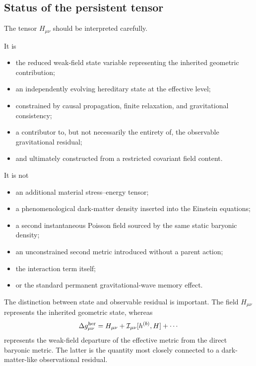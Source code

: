 \subsection{Status of the persistent tensor}
\label{subsec:persistent-tensor-status}

The tensor $H_{\mu\nu}$ should be interpreted carefully.

It is
\begin{itemize}
    \item the reduced weak-field state variable representing the inherited
    geometric contribution;

    \item an independently evolving hereditary state at the effective level;

    \item constrained by causal propagation, finite relaxation, and
    gravitational consistency;

    \item a contributor to, but not necessarily the entirety of, the observable
    gravitational residual;

    \item and ultimately constructed from a restricted covariant field content.
\end{itemize}

It is not
\begin{itemize}
    \item an additional material stress--energy tensor;

    \item a phenomenological dark-matter density inserted into the Einstein
    equations;

    \item a second instantaneous Poisson field sourced by the same static
    baryonic density;

    \item an unconstrained second metric introduced without a parent action;

    \item the interaction term itself;

    \item or the standard permanent gravitational-wave memory effect.
\end{itemize}

The distinction between state and observable residual is important. The field
$H_{\mu\nu}$ represents the inherited geometric state, whereas
\begin{equation}
    \Delta g_{\mu\nu}^{\rm her}
    =
    H_{\mu\nu}
    +
    \mathcal{I}_{\mu\nu}[h^{(b)},H]
    +
    \cdots
\end{equation}
represents the weak-field departure of the effective metric from the direct
baryonic metric. The latter is the quantity most closely connected to a
dark-matter-like observational residual.

